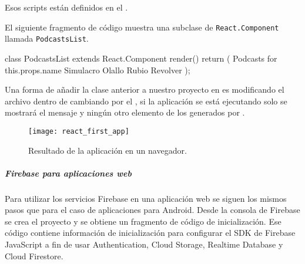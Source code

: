 Esos scripts están definidos en el .

El siguiente fragmento de código muestra una subclase
de \texttt{React.Component} llamada \texttt{PodcastsList}.


%
\begin{sphinxVerbatim}[commandchars=\\\{\}]
class PodcastsList extends React.Component \PYGZob{}
  render() \PYGZob{}
    return (
       
        Podcasts for \PYGZob{}this.props.name\PYGZcb{}
          Simulacro
          Olallo Rubio
          Revolver
    );
  \PYGZcb{}
\PYGZcb{}
\end{sphinxVerbatim}

Una forma de añadir la clase anterior a nuestro proyecto
en  es modificando el archivo  dentro
de  cambiando  por el , si la aplicación
se está ejecutando solo se mostrará el mensaje y ningún otro elemento de los
generados por .


\begin{figure}[ht]
\centering
\caption{Resultado de la aplicación en un navegador.}
\texttt{[image: react\_first\_app]}
\end{figure}


\subparagraph{Firebase para aplicaciones web}

Para utilizar los servicios Firebase en una aplicación web
se siguen los mismos pasos que para el caso de 
aplicaciones para Android. Desde la consola de Firebase
se crea el proyecto y se obtiene un fragmento de código
de inicialización. Ese código  contiene información de inicialización para configurar el SDK de Firebase JavaScript a fin de usar Authentication, Cloud Storage, Realtime Database y Cloud Firestore.


